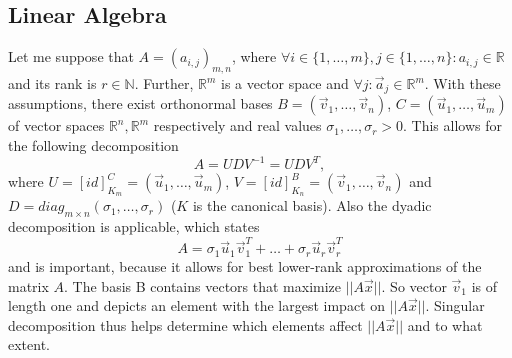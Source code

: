 \documentclass{article}
\begin{document}
\subsection{Linear Algebra}
Let me suppose that $A = (a_{i,j})_{m, n}$, where $\forall i \in \{ 1, \dots, m \}, j \in \{ 1, \dots, n \}: a_{i,j} \in \mathbb{R}$ and its rank is $r \in \mathbb{N}$.
Further, $\mathbb{R}^{m}$ is a vector space and $\forall j: \vec{a}_j \in \mathbb{R}^m$.
With these assumptions, there exist orthonormal bases $B = (\vec{v}_1, \dots, \vec{v}_n)$, $C = (\vec{u}_1, \dots, \vec{u}_m)$ of vector spaces $\mathbb{R}^{n}, \mathbb{R}^{m}$ respectively and real values $\sigma_1, \dots, \sigma_r > 0$.
This allows for the following decomposition
$$
A = UDV^{-1} = UDV^{T},
$$
where $U = [id]^{C}_{K_m} = (\vec{u}_1, \dots, \vec{u}_m)$, $V = [id]^{B}_{K_n} = (\vec{v}_1, \dots, \vec{v}_n)$ and 
$D = diag_{m \times n}(\sigma_1, \dots, \sigma_r)$ ($K$ is the canonical basis).
Also the dyadic decomposition is applicable, which states
$$
A = \sigma_1 \vec{u}_1 \vec{v}_1^T + \dots + \sigma_r \vec{u}_r \vec{v}_r^T
$$
and is important, because it allows for best lower-rank approximations of the matrix $A$.
The basis B contains vectors that maximize $||A\vec{x}||$.
So vector $\vec{v}_1$ is of length one and depicts an element with the largest impact on $||A\vec{x}||$.
Singular decomposition thus helps determine which elements affect $||A\vec{x}||$ and to what extent.
\end{document}
